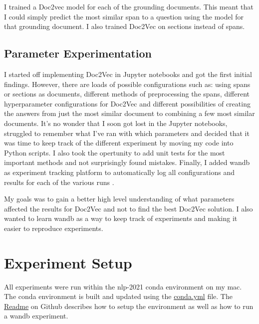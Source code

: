 \documentclass[11pt]{article}
\begin{document}
    I trained a Doc2vec model for each of the grounding documents. This meant that I could simply predict
    the most similar span to a question using the model for that grounding document. I also trained Doc2Vec on sections instead
    of spans.

    \subsection{Parameter Experimentation}\label{subsec:experimentation-method}
    I started off implementing Doc2Vec in Jupyter notebooks and got the first initial findings. However, there are loads
    of possible configurations such as: using spans or sections as documents, different methods of preprocessing the spans, different
    hyperparameter configurations for Doc2Vec and different possibilities of creating the answers from just the most similar
    document to combining a few most similar documents. It's no wonder that I soon got lost in the Jupyter notebooks, struggled
    to remember what I've ran with which parameters and
    decided that it was time to keep track of the different experiment by moving my code into Python scripts. I also took
    the opertunity to add unit tests for the most important methods and not surprisingly found mistakes.
    Finally, I added wandb as experiment tracking platform to automatically log all configurations and results for each of
    the various runs \cite{wandb}.

    My goals was to gain a better high level understanding of what parameters affected the results for Doc2Vec and not to
    find the best Doc2Vec solution. I also wanted to learn wandb as a way to keep track of experiments and making it easier
    to reproduce experiments.


    \section{Experiment Setup}\label{sec:experiment-setup}

    All experiments were run within the nlp-2021 conda environment on my mac. The conda environment is built and updated using the
    \href{https://github.com/isabelladegen/nlp-2021/blob/main/conda.yml}{conda.yml} file. The
    \href{https://github.com/isabelladegen/nlp-2021}{Readme} on Github describes how to setup the environment as well
    as how to run a wandb experiment.
\end{document}
